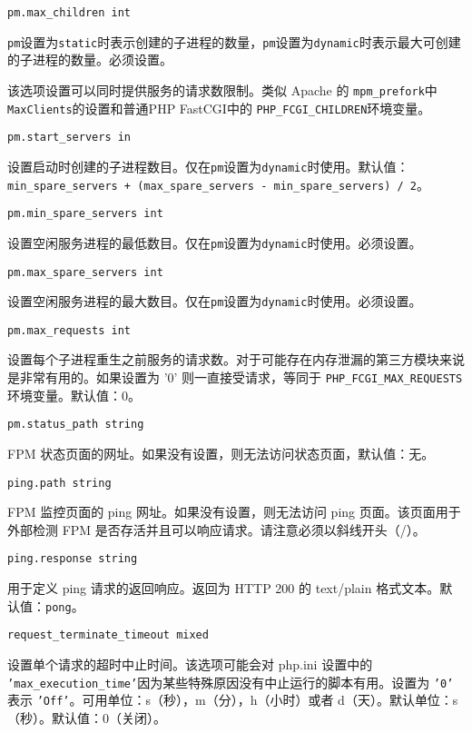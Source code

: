 \begin{compactitem}
\begin{compactitem}
\item \texttt{pm.max\_children int}

\texttt{pm}设置为\texttt{static}时表示创建的子进程的数量，\texttt{pm}设置为\texttt{dynamic}时表示最大可创建的子进程的数量。必须设置。

该选项设置可以同时提供服务的请求数限制。类似 Apache 的 \texttt{mpm\_prefork}中 \texttt{MaxClients}的设置和普通PHP FastCGI中的 \texttt{PHP\_FCGI\_CHILDREN}环境变量。

\item \texttt{pm.start\_servers in}

设置启动时创建的子进程数目。仅在\texttt{pm}设置为\texttt{dynamic}时使用。默认值：\texttt{min\_spare\_servers + (max\_spare\_servers - min\_spare\_servers) / 2}。

\item \texttt{pm.min\_spare\_servers int}

设置空闲服务进程的最低数目。仅在\texttt{pm}设置为\texttt{dynamic}时使用。必须设置。

\item \texttt{pm.max\_spare\_servers int}

设置空闲服务进程的最大数目。仅在\texttt{pm}设置为\texttt{dynamic}时使用。必须设置。

\item \texttt{pm.max\_requests int}

设置每个子进程重生之前服务的请求数。对于可能存在内存泄漏的第三方模块来说是非常有用的。如果设置为 '0' 则一直接受请求，等同于 \texttt{PHP\_FCGI\_MAX\_REQUESTS}环境变量。默认值：0。

\item \texttt{pm.status\_path string}

FPM 状态页面的网址。如果没有设置，则无法访问状态页面，默认值：无。

\item \texttt{ping.path string}

FPM 监控页面的 ping 网址。如果没有设置，则无法访问 ping 页面。该页面用于外部检测 FPM 是否存活并且可以响应请求。请注意必须以斜线开头（/）。

\item \texttt{ping.response string}

用于定义 ping 请求的返回响应。返回为 HTTP 200 的 text/plain 格式文本。默认值：\texttt{pong}。

\item \texttt{request\_terminate\_timeout mixed}

设置单个请求的超时中止时间。该选项可能会对 php.ini 设置中的 \texttt{'max\_execution\_time'}因为某些特殊原因没有中止运行的脚本有用。设置为 \texttt{'0'} 表示 \texttt{'Off'}。可用单位：s（秒），m（分），h（小时）或者 d（天）。默认单位：s（秒）。默认值：0（关闭）。


\end{compactitem}
\end{compactitem}
